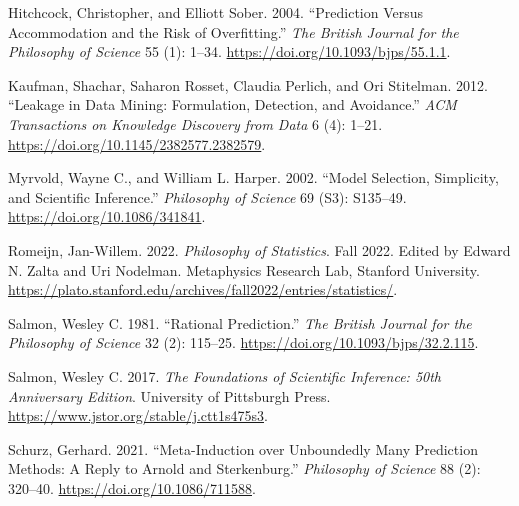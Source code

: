 \documentclass[
  letterpaper,
  DIV=11,
  numbers=noendperiod]{scrartcl}
\newlength{\cslhangindent}
\newenvironment{CSLReferences}[2] %
 {\begin{list}{}{%
  \setlength{\itemindent}{0pt}
  \setlength{\leftmargin}{0pt}
  \setlength{\parsep}{0pt}
  \ifodd #1
   \setlength{\leftmargin}{\cslhangindent}
   \setlength{\itemindent}{-1\cslhangindent}
  \fi
  \setlength{\itemsep}{#2\baselineskip}}}
 {\end{list}}
\theoremstyle{definition}
\theoremstyle{remark}
\begin{document}
\begin{CSLReferences}{1}{1}
Hitchcock, Christopher, and Elliott Sober. 2004. {``Prediction Versus
Accommodation and the Risk of Overfitting.''} \emph{The British Journal
for the Philosophy of Science} 55 (1): 1--34.
\url{https://doi.org/10.1093/bjps/55.1.1}.

Kaufman, Shachar, Saharon Rosset, Claudia Perlich, and Ori Stitelman.
2012. {``Leakage in Data Mining: Formulation, Detection, and
Avoidance.''} \emph{ACM Transactions on Knowledge Discovery from Data} 6
(4): 1--21. \url{https://doi.org/10.1145/2382577.2382579}.

Myrvold, Wayne C., and William L. Harper. 2002. {``Model Selection,
Simplicity, and Scientific Inference.''} \emph{Philosophy of Science} 69
(S3): S135--49. \url{https://doi.org/10.1086/341841}.

Romeijn, Jan-Willem. 2022. \emph{Philosophy of Statistics}. Fall 2022.
Edited by Edward N. Zalta and Uri Nodelman. Metaphysics Research Lab,
Stanford University.
\url{https://plato.stanford.edu/archives/fall2022/entries/statistics/}.

Salmon, Wesley C. 1981. {``Rational Prediction.''} \emph{The British
Journal for the Philosophy of Science} 32 (2): 115--25.
\url{https://doi.org/10.1093/bjps/32.2.115}.

Salmon, Wesley C. 2017. \emph{The Foundations of Scientific Inference:
50th Anniversary Edition}. University of Pittsburgh Press.
\url{https://www.jstor.org/stable/j.ctt1s475s3}.

Schurz, Gerhard. 2021. {``Meta-Induction over Unboundedly Many
Prediction Methods: A Reply to Arnold and Sterkenburg.''}
\emph{Philosophy of Science} 88 (2): 320--40.
\url{https://doi.org/10.1086/711588}.

\end{CSLReferences}
\end{document}
